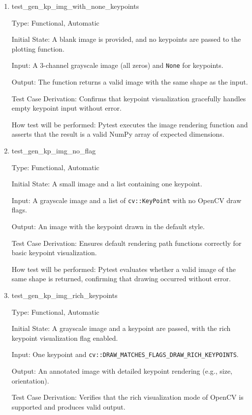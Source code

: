 \documentclass[12pt, titlepage]{article}
\begin{document}
\begin{enumerate}
\item{test\_gen\_kp\_img\_with\_none\_keypoints\\}

Type: Functional, Automatic

Initial State: A blank image is provided, and no keypoints are passed to the plotting function.

Input: A 3-channel grayscale image (all zeros) and \texttt{None} for keypoints.

Output: The function returns a valid image with the same shape as the input.

Test Case Derivation: Confirms that keypoint visualization gracefully handles empty keypoint input without error.

How test will be performed: Pytest executes the image rendering function and asserts that the result is a valid NumPy array of expected dimensions.

\item{test\_gen\_kp\_img\_no\_flag\\}

Type: Functional, Automatic

Initial State: A small image and a list containing one keypoint.

Input: A grayscale image and a list of \texttt{cv::KeyPoint} with no OpenCV draw flags.

Output: An image with the keypoint drawn in the default style.

Test Case Derivation: Ensures default rendering path functions correctly for basic keypoint visualization.

How test will be performed: Pytest evaluates whether a valid image of the same shape is returned, confirming that drawing occurred without error.


\item{test\_gen\_kp\_img\_rich\_keypoints\\}

Type: Functional, Automatic

Initial State: A grayscale image and a keypoint are passed, with the rich keypoint visualization flag enabled.

Input: One keypoint and \texttt{cv::DRAW\_MATCHES\_FLAGS\_DRAW\_RICH\_KEYPOINTS}.

Output: An annotated image with detailed keypoint rendering (e.g., size, orientation).

Test Case Derivation: Verifies that the rich visualization mode of OpenCV is supported and produces valid output.


\end{enumerate}
\end{document}
